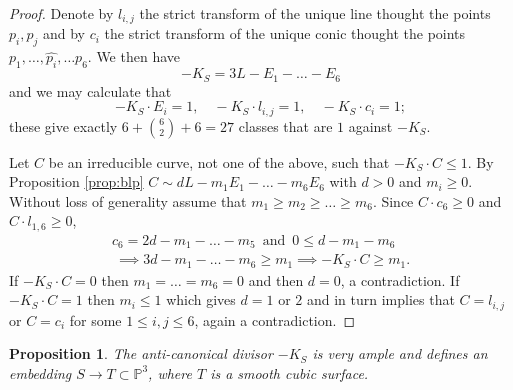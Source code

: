 \documentclass[a4paper,11pt]{amsart}
\newtheorem{proposition}[theorem]{Proposition}
\newcommand{\PP}{\mathbb{P}}
\begin{document}
\begin{proof}
	Denote by $l_{i,j}$ the strict transform of the unique line thought the points $p_i,p_j$ and by $c_i$ the strict transform of the unique conic thought the points $p_1,\dots,\hat{p_i},\dots p_6$.	
	We then have
	\[
	-K_S = 3L - E_1 - \ldots - E_6
	\]
	and we may calculate that
	\[
	-K_S\cdot E_i = 1, \quad -K_S\cdot l_{i,j} = 1, \quad -K_S\cdot c_i = 1;
	\]
	these give exactly $6 + \binom{6}{2} + 6 = 27$ classes that are $1$ against $-K_S$.
	
	Let $C$ be an irreducible curve, not one of the above, such that $-K_S\cdot C \leq 1$.
	By Proposition \ref{prop:blp} $C  \sim dL - m_1E_1 - \ldots - m_6E_6$ with $d > 0$ and $m_i \geq 0$.
	Without loss of generality assume that $m_1 \geq m_2 \geq \ldots \geq m_6$.
	Since $C\cdot c_6 \geq 0$ and $C\cdot l_{1,6}\geq 0$,
	\begin{gather*}
		 c_6  = 2d - m_1 - \ldots - m_5 \, \text{ and } \, 0\leq  d - m_1 - m_6\\\
		\implies  3d - m_1 - \ldots - m_6 \geq m_1 \implies -K_S\cdot C \geq m_1.
	\end{gather*}
	If $-K_S\cdot C = 0$ then $m_1 = \ldots = m_6 =0$ and then $d=0$, a contradiction.
	If $-K_S\cdot C = 1$ then $m_i \leq 1$ which gives $d = 1$ or $2$ and in turn implies that $C = l_{i,j}$ or $C = c_i$ for some $1 \leq i,j \leq 6$, again a contradiction.
\end{proof}

\begin{proposition}\label{prop:cubicEmbedding}
	The anti-canonical divisor $-K_S$ is very ample and defines an embedding $S \to T \subset \PP^3$, where $T$ is a smooth cubic surface.
\end{proposition}
\end{document}

